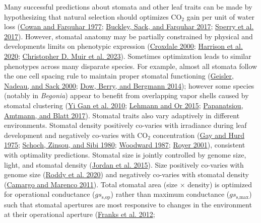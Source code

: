 \documentclass[12pt,halfline,a4paper,]{ouparticle}
\begin{document}
Many successful predictions about stomata and other leaf traits can be
made by hypothesizing that natural selection should optimizes CO\(_2\)
gain per unit of water loss
(\protect\hyperlink{ref-cowan_stomatal_1977}{Cowan and Farquhar 1977};
\protect\hyperlink{ref-buckley_optimal_2017}{Buckley, Sack, and Farquhar
2017}; \protect\hyperlink{ref-sperry_predicting_2017}{Sperry et al.
2017}). However, stomatal anatomy may be partially constrained by
physical and developments limits on phenotypic expression
(\protect\hyperlink{ref-croxdale_stomatal_2000}{Croxdale 2000};
\protect\hyperlink{ref-harrison_influence_2020}{Harrison et al. 2020};
\protect\hyperlink{ref-muir_how_2023}{Christopher D. Muir et al. 2023}).
Sometimes optimization leads to similar phenotypes across many disparate
species. For example, almost all stomata follow the one cell spacing
rule to maintain proper stomatal functioning
(\protect\hyperlink{ref-geisler_oriented_2000}{Geisler, Nadeau, and Sack
2000}; \protect\hyperlink{ref-dow_physiological_2014}{Dow, Berry, and
Bergmann 2014}); however some species (notably in \emph{Begonia}) appear
to benefit from overlapping vapor shells caused by stomatal clustering
(\protect\hyperlink{ref-yi_gan_stomatal_2010}{Yi Gan et al. 2010};
\protect\hyperlink{ref-lehmann_effects_2015}{Lehmann and Or 2015};
\protect\hyperlink{ref-papanatsiou_stomatal_2017}{Papanatsiou, Amtmann,
and Blatt 2017}). Stomatal traits also vary adaptively in different
environments. Stomatal density positively co-varies with irradiance
during leaf development and negatively co-varies with CO\(_2\)
concentration (\protect\hyperlink{ref-gay_influence_1975}{Gay and Hurd
1975}; \protect\hyperlink{ref-schoch_dependence_1980}{Schoch, Zinsou,
and Sibi 1980}; \protect\hyperlink{ref-woodward_stomatal_1987}{Woodward
1987}; \protect\hyperlink{ref-royer_stomatal_2001}{Royer 2001}),
consistent with optimality predictions. Stomatal size is jointly
controlled by genome size, light, and stomatal density
(\protect\hyperlink{ref-jordan_environmental_2015}{Jordan et al. 2015}).
Size positively co-varies with genome size
(\protect\hyperlink{ref-roddy_scaling_2020}{Roddy et al. 2020}) and
negatively co-varies with stomatal density
(\protect\hyperlink{ref-camargo_density_2011}{Camargo and Marenco
2011}). Total stomatal area (size \(\times\) density) is optimized for
operational conductance (\(gs_\text{s,op}\)) rather than maximum
conductance (\(gs_\text{s,max}\)) such that stomatal apertures are most
responsive to changes in the environment at their operational aperture
(\protect\hyperlink{ref-franks_physiological_2012}{Franks et al. 2012};
\end{document}

